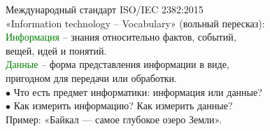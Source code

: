 \newpage
\rhead{\textbf{\textcolor{blue}{Т}\textcolor{gray}{ерминология: Информация и данные}}}

\vspace*{5mm}
\newline
 Международный стандарт ISO/IEC 2382:2015\\
«Information technology – Vocabulary» (вольный пересказ):\\
\qquad \quad \textcolor{Green}{Информация} – знания относительно фактов, событий, \\ 
\qquad \quad вещей, идей и  понятий.\\
\qquad \quad \textcolor{Green}{Данные} – форма представления информации в виде, \\ 
\qquad \quad пригодном для передачи или обработки. \\
\vspace*{3mm}
$\bullet$ \quad Что есть предмет информатики: информация или данные? \\
$\bullet$ \quad Как измерить информацию? Как измерить данные?\\	
\qquad Пример: «Байкал — самое глубокое озеро Земли».
